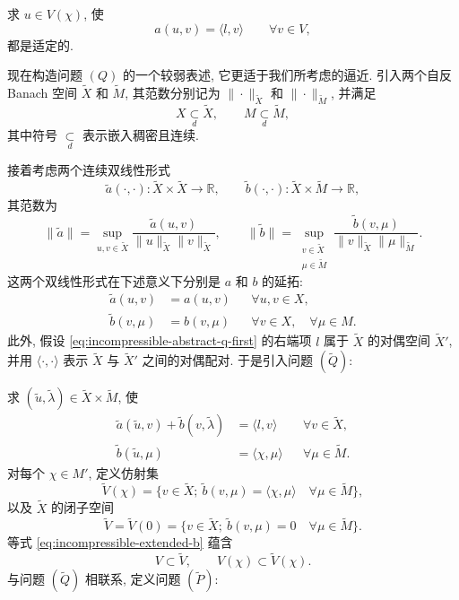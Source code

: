 求 $u\in V(\chi)$, 使
\begin{equation}\label{eq:incompressible-abstract-p}
a(u,v)=\langle l,v\rangle
\qquad\forall v\in V,
\end{equation}
都是适定的.

现在构造问题 $(Q)$ 的一个较弱表述, 它更适于我们所考虑的逼近.
引入两个自反 Banach 空间 $\widetilde X$ 和 $\widetilde M$,
其范数分别记为 $\|\cdot\|_{\widetilde X}$ 和
$\|\cdot\|_{\widetilde M}$, 并满足
\[
X\mathrel{\mathop{\subset}\limits_d}\widetilde X,
\qquad
M\mathrel{\mathop{\subset}\limits_d}\widetilde M,
\]
其中符号 $\mathrel{\mathop{\subset}\limits_d}$ 表示嵌入稠密且连续.

接着考虑两个连续双线性形式
\[
\widetilde a(\cdot,\cdot):
\widetilde X\times\widetilde X\longrightarrow\mathbb R,
\qquad
\widetilde b(\cdot,\cdot):
\widetilde X\times\widetilde M\longrightarrow\mathbb R,
\]
其范数为
\[
\|\widetilde a\|
=\sup_{u,v\in\widetilde X}
\frac{\widetilde a(u,v)}
{\|u\|_{\widetilde X}\|v\|_{\widetilde X}},
\qquad
\|\widetilde b\|
=\sup_{\substack{v\in\widetilde X\\ \mu\in\widetilde M}}
\frac{\widetilde b(v,\mu)}
{\|v\|_{\widetilde X}\|\mu\|_{\widetilde M}}.
\]
这两个双线性形式在下述意义下分别是 $a$ 和 $b$ 的延拓:
\begin{align}
\widetilde a(u,v)&=a(u,v)
&&\forall u,v\in X,\label{eq:incompressible-extended-a}\\
\widetilde b(v,\mu)&=b(v,\mu)
&&\forall v\in X,\quad\forall\mu\in M.
\label{eq:incompressible-extended-b}
\end{align}
此外, 假设 \eqref{eq:incompressible-abstract-q-first} 的右端项
$l$ 属于 $\widetilde X$ 的对偶空间 $\widetilde X'$,
并用 $\langle\cdot,\cdot\rangle$ 表示
$\widetilde X$ 与 $\widetilde X'$ 之间的对偶配对.
于是引入问题 $(\widetilde Q)$:

求 $(\widetilde u,\widetilde\lambda)
\in\widetilde X\times\widetilde M$, 使
\begin{align}
\widetilde a(\widetilde u,v)
+\widetilde b(v,\widetilde\lambda)
&=\langle l,v\rangle
&&\forall v\in\widetilde X,
\label{eq:incompressible-weak-q-first}\\
\widetilde b(\widetilde u,\mu)
&=\langle\chi,\mu\rangle
&&\forall\mu\in\widetilde M.
\label{eq:incompressible-weak-q-second}
\end{align}
对每个 $\chi\in M'$, 定义仿射集
\begin{equation}\label{eq:incompressible-weak-affine-set}
\widetilde V(\chi)
=\{v\in\widetilde X;\
\widetilde b(v,\mu)=\langle\chi,\mu\rangle
\quad\forall\mu\in\widetilde M\},
\end{equation}
以及 $\widetilde X$ 的闭子空间
\begin{equation}\label{eq:incompressible-weak-kernel}
\widetilde V=\widetilde V(0)
=\{v\in\widetilde X;\
\widetilde b(v,\mu)=0\quad\forall\mu\in\widetilde M\}.
\end{equation}
等式 \eqref{eq:incompressible-extended-b} 蕴含
\begin{equation}\label{eq:incompressible-kernel-inclusions}
V\subset\widetilde V,
\qquad
V(\chi)\subset\widetilde V(\chi).
\end{equation}
与问题 $(\widetilde Q)$ 相联系, 定义问题 $(\widetilde P)$:


